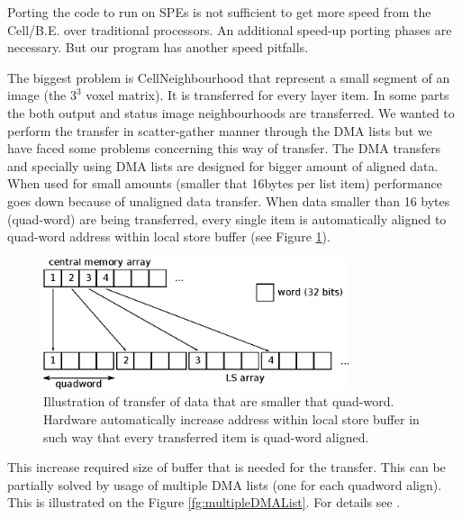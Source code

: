\par
Porting the code to run on SPEs is not sufficient to get more speed from the Cell/B.E. over traditional processors.
An additional speed-up porting phases are necessary.
But our program has another speed pitfalls.

\par
The biggest problem is CellNeighbourhood that represent a small segment of an image (the $3^3$ voxel matrix).
It is transferred for every layer item.
In some parts the both output and status image neighbourhoods are transferred.
We wanted to perform the transfer in scatter-gather manner through the DMA lists but we have faced some problems concerning this way of transfer.
The DMA transfers and specially using DMA lists are designed for bigger amount of aligned data.
When used for small amounts (smaller that 16bytes per list item) performance goes down because of unaligned data transfer.
When data smaller than 16 bytes (quad-word) are being transferred, every single item is automatically aligned to quad-word address within local store buffer (see Figure \ref{fg:automaticAlignOfSmallData}).

\begin{figure}
    \centering
    \includegraphics[width=0.8\textwidth]{data/automaticAlignOfSmallData}
    \caption[Automatic align of small data]
{
  Illustration of transfer of data that are smaller that quad-word.
  Hardware automatically increase address within local store buffer in such way that every transferred item is quad-word aligned.
}
    \label{fg:automaticAlignOfSmallData}
\end{figure}

This increase required size of buffer that is needed for the transfer.
This can be partially solved by usage of multiple DMA lists (one for each quadword align).
This is illustrated on the Figure \ref{fg:multipleDMAList}.
For details see \cite{DMAListIssues}.

